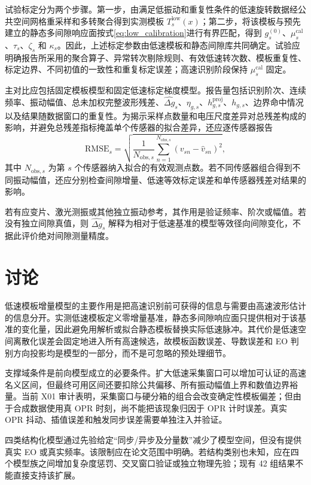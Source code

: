 \documentclass[UTF8,12pt,a4paper]{ctexart}
\begin{document}
试验标定分为两个步骤。第一步，由满足低振动和重复性条件的低速旋转数据经公共空间网格重采样和多转聚合得到实测模板 $T_s^{\mathrm{low}}(x)$；第二步，将该模板与预先建立的静态多间隙响应面按式\eqref{eq:low_calibration}进行有界匹配，得到 $g_s^{(0)}$、$\mu_s^{\mathrm{cal}}$、$\tau_s$、$\zeta_s$ 和 $\kappa_s$。因此，上述标定参数由低速模板和静态间隙库共同确定。试验应明确报告所采用的聚合算子、异常转次剔除规则、有效低速转次数、模板重复性、标定边界、不同初值的一致性和重复标定误差；高速识别阶段保持 $\mu_s^{\mathrm{cal}}$ 固定。

主对比应包括固定模板模型和固定低速标定梯度模型。报告量包括识别阶次、连续频率、振动幅值、总未加权完整波形残差、$\widehat{\Delta g}_s$、$\eta_{g,s}$、$h_{g,s}^{\mathrm{proj}}$、$h_{g,s}$、边界命中情况以及结果随数据窗口的重复性。为揭示采样点数量和电压尺度差异对总残差构成的影响，并避免总残差指标掩盖单个传感器的拟合差异，还应逐传感器报告
\begin{equation}
\mathrm{RMSE}_s=
\sqrt{\frac{1}{N_{\mathrm{obs},s}}\sum_{n=1}^{N_{\mathrm{obs},s}}
\left(v_{sn}-\widehat v_{sn}\right)^2},
\label{eq:sensor_rmse}
\end{equation}
其中 $N_{\mathrm{obs},s}$ 为第 $s$ 个传感器纳入拟合的有效观测点数。若不同传感器组合得到不同振动幅值，还应分别检查间隙增量、低速等效标定误差和单传感器残差对结果的影响。

若有应变片、激光测振或其他独立振动参考，其作用是验证频率、阶次或幅值。若没有独立间隙真值，则 $\widehat{\Delta g}_s$ 解释为相对于低速基准的模型等效径向间隙变化，不据此评价绝对间隙测量精度。

\section{讨论}

低速模板增量模型的主要作用是把高速识别前可获得的信息与需要由高速波形估计的信息分开。实测低速模板定义零增量基准，静态多间隙响应面只提供相对于该基准的变化量，因此避免用解析或拟合静态模板替换实际低速脉冲。其代价是低速空间离散化误差会固定地进入所有高速候选，故模板函数误差、导数误差和 EO 判别方向投影均是模型的一部分，而不是可忽略的预处理细节。

支撑域条件是前向模型成立的必要条件。扩大低速采集窗口可以增加可认证的高速名义区间，但最终可用区间还要扣除公共偏移、所有振动幅值上界和数值边界裕量。当前 X01 审计表明，采集窗口与硬分箱的组合会改变确定性模板偏差；但由于合成数据使用真 OPR 时刻，尚不能把该现象归因于 OPR 计时误差。真实 OPR 抖动、插值误差和触发同步误差需要单独注入并验证。

四类结构化模型通过先验给定“同步/异步及分量数”减少了模型空间，但没有提供真实 EO 或真实频率。该限制应在论文范围中明确。若结构类别也未知，应在四个模型族之间增加复杂度惩罚、交叉窗口验证或独立物理先验；现有 42 组结果不能直接支持该扩展。
\end{document}
